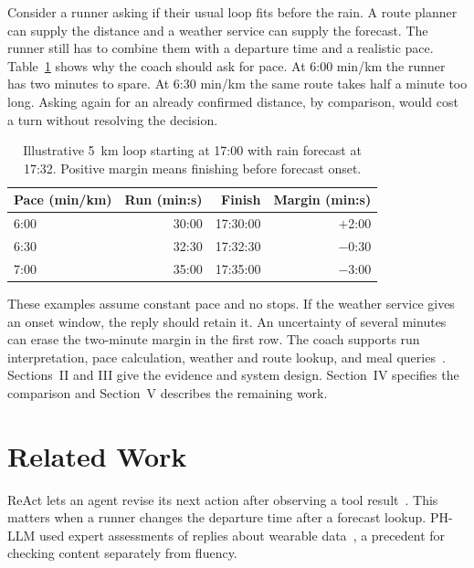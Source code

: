 \documentclass[conference]{IEEEtran}
\begin{document}
Consider a runner asking if their usual loop fits before the rain. A route planner can supply the distance and a weather service can supply the forecast. The runner still has to combine them with a departure time and a realistic pace. Table~\ref{tab:margin} shows why the coach should ask for pace. At 6:00 min/km the runner has two minutes to spare. At 6:30 min/km the same route takes half a minute too long. Asking again for an already confirmed distance, by comparison, would cost a turn without resolving the decision.

\begin{table}[!b]
\caption{Illustrative 5~km loop starting at 17:00 with rain forecast at 17:32. Positive margin means finishing before forecast onset.}
\label{tab:margin}\centering\small
\begin{tabular}{@{}lrrr@{}}\toprule
Pace (min/km) & Run (min:s) & Finish & Margin (min:s)\\\midrule
6:00 & 30:00 & 17:30:00 & $+$2:00\\
6:30 & 32:30 & 17:32:30 & $-$0:30\\
7:00 & 35:00 & 17:35:00 & $-$3:00\\\bottomrule
\end{tabular}
\end{table}
These examples assume constant pace and no stops. If the weather service gives an onset window, the reply should retain it. An uncertainty of several minutes can erase the two-minute margin in the first row.
The coach supports run interpretation, pace calculation, weather and route lookup, and meal queries~\cite{proposal}. Sections~II and III give the evidence and system design. Section~IV specifies the comparison and Section~V describes the remaining work.

\section{Related Work}
ReAct lets an agent revise its next action after observing a tool result~\cite{react}. This matters when a runner changes the departure time after a forecast lookup. PH-LLM used expert assessments of replies about wearable data~\cite{phllm}, a precedent for checking content separately from fluency.
\end{document}
